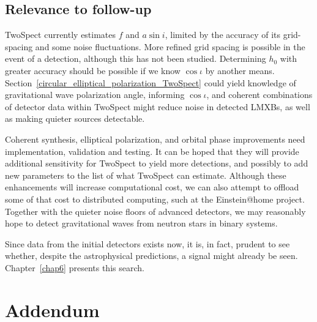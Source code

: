 
\subsection{Relevance to follow-up}

TwoSpect currently estimates $f$ and $a \sin i$, limited by the accuracy of its grid-spacing and some noise fluctuations. 
More refined grid spacing is possible in the event of a detection, although this has not been studied. 
Determining $h_0$ with greater accuracy should be possible if we know $\cos \iota$ by another means.
Section~\ref{circular_elliptical_polarization_TwoSpect} could yield knowledge of gravitational wave polarization angle, informing $\cos \iota$, and coherent combinations of detector data within TwoSpect might reduce noise in detected LMXBs, as well as making quieter sources detectable. 

Coherent synthesis, elliptical polarization, and orbital phase improvements
need implementation, validation and testing.
It can be hoped that they will provide additional sensitivity for TwoSpect to yield more detections, and possibly to add new parameters to the list of what TwoSpect can estimate.
Although these enhancements will increase computational cost, we can also attempt to offload some of that cost to distributed computing, such at the Einstein@home project.
Together with the quieter noise floors of advanced detectors, we may reasonably hope to detect gravitational waves from neutron stars in binary systems.

Since data from the initial detectors exists now, it is, in fact, prudent to see whether, despite the astrophysical predictions, a signal might already be seen.
Chapter~\ref{chap6} presents this search.

\section{Addendum}
\label{chap5_addendum}

